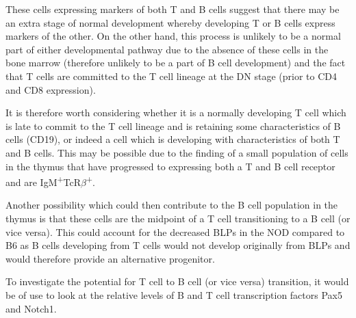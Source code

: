 These cells expressing markers of both T and B cells suggest that there may be an extra stage of normal development whereby developing T or B cells express markers of the other.
On the other hand, this process is unlikely to be a normal part of either developmental pathway due to the absence of these cells in the bone marrow (therefore unlikely to be a part of B cell development) and the fact that T cells are committed to the T cell lineage at the DN stage (prior to CD4 and CD8 expression).

It is therefore worth considering whether it is a normally developing T cell which is late to commit to the T cell lineage and is retaining some characteristics of B cells (CD19), or indeed a cell which is developing with characteristics of both T and B cells.
This may be possible due to the finding of a small population of cells in the thymus that have progressed to expressing both a T and B cell receptor and are IgM\textsuperscript{+}TcR$\beta$\textsuperscript{+}.

Another possibility which could then contribute to the B cell population in the thymus is that these cells are the midpoint of a T cell transitioning to a B cell (or vice versa).
This could account for the decreased BLPs in the NOD compared to B6 as B cells developing from T cells would not develop originally from BLPs and would therefore provide an alternative progenitor.

To investigate the potential for T cell to B cell (or vice versa) transition, it would be of use to look at the relative levels of B and T cell transcription factors Pax5 and Notch1.

